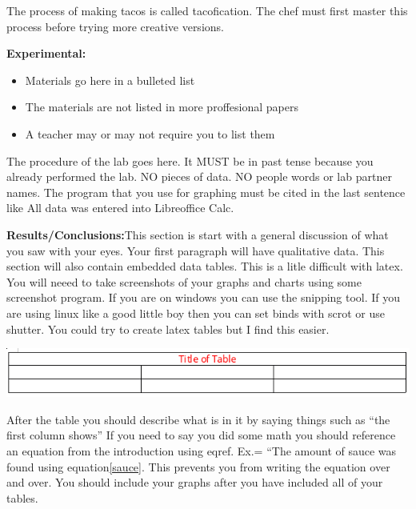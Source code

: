 \documentclass{report}
\begin{document}
The process of making tacos is called tacofication\supercite{taco}. The chef must first master this process before trying more creative versions. 
\begin{flushleft}
\textbf{Experimental:}
\end{flushleft}
\begin{itemize}
\item{Materials go here in a bulleted list}
\item{The materials are not listed in more proffesional papers}
\item{A teacher may or may not require you to list them}
\end{itemize}
\hspace{6ex}The procedure of the lab goes here. It MUST be in past tense because you already performed the lab. NO pieces of data. NO people words or lab partner names. The program that you use for graphing must be cited in the last sentence like All data was entered into Libreoffice Calc\supercite{libreoffice}.
\begin{flushleft}
\textbf{Results/Conclusions:}This section is start with a general discussion of what you saw with your eyes. Your first paragraph will have qualitative data. This section will also contain embedded data tables. This is a litle difficult with latex. You will neeed to take screenshots of your graphs and charts using some screenshot program. If you are on windows you can use the snipping tool. If you are using linux like a good little boy then you can set binds with scrot or use shutter. You could try to create latex tables but I find this easier.
\end{flushleft}
\begin{center}
\includegraphics[scale=.7]{examplechart}
\end{center}
\begin{flushleft} 
\hspace{6ex}After the table you should describe what is in it by saying things such as ``the first column shows'' If you need to say you did some math you should reference an equation from the introduction using eqref. Ex.= ``The amount of sauce was found using equation\eqref{sauce}. This prevents you from writing the equation over and over. You should include your graphs after you have included all of your tables. 
\end{flushleft}
\end{document}
